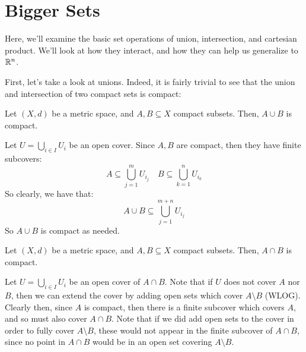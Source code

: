 \documentclass{article}
\begin{document}
\section{Bigger Sets}

Here, we'll examine the basic set operations of union, intersection, and cartesian product.
We'll look at how they interact, and how they can help us generalize to $ \mathbb{R}^{n} $. \npgh

First, let's take a look at unions.
Indeed, it is fairly trivial to see that the union and intersection of two compact sets is compact:

\begin{lm}
    Let $ (X, d) $ be a metric space, and $ A, B \subseteq X $ compact subsets.
    Then, $ A \cup B $ is compact.
\end{lm}

\begin{pf}
    Let $ U = \bigcup_{i \in I} U_{i} $ be an open cover.
    Since $ A, B $ are compact, then they have finite subcovers:
    \begin{equation*}
        A \subseteq \bigcup_{j=1}^{m} U_{i_{j}} \quad
        B \subseteq \bigcup_{k=1}^{n} U_{i_{k}}
    \end{equation*}
    So clearly, we have that:
    \begin{equation*}
        A \cup B \subseteq \bigcup_{j=1}^{m+n} U_{i_{j}}
    \end{equation*}
    So $ A \cup B $ is compact as needed.
\end{pf}

\begin{lm}
    Let $ (X, d) $ be a metric space, and $ A, B \subseteq X $ compact subsets.
    Then, $ A \cap B $ is compact.
\end{lm}

\begin{pf}
    Let $ U = \bigcup_{i \in I} U_{i} $ be an open cover of $ A \cap B $.
    Note that if $ U $ does not cover $ A $ nor $ B $, then we can extend the cover
    by adding open sets which cover $ A \setminus B $ (WLOG). \vsp
    Clearly then, since $ A $ is compact, then there is a finite subcover which covers $ A $,
    and so must also cover $ A \cap B $. \vsp
    Note that if we did add open sets to the cover in order to fully cover $ A \setminus B $,
    these would not appear in the finite subcover of $ A \cap B $, since no point in $ A \cap B $
    would be in an open set covering $ A \setminus B $.
\end{pf}
\end{document}
